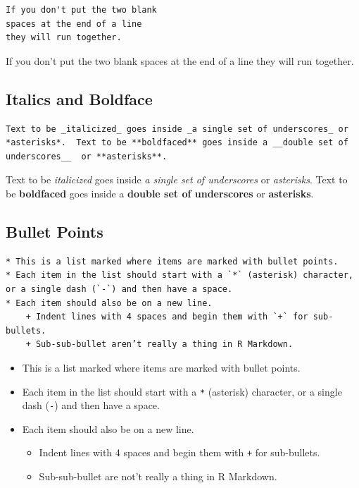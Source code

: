 \documentclass[]{book}
\providecommand{\tightlist}{%
  \setlength{\itemsep}{0pt}\setlength{\parskip}{0pt}}
\theoremstyle{definition}
\theoremstyle{definition}
\theoremstyle{definition}
\theoremstyle{remark}
\begin{document}
\begin{verbatim}
If you don't put the two blank
spaces at the end of a line
they will run together.
\end{verbatim}

If you don't put the two blank spaces at the end of a line they will run
together.

\hypertarget{italics-and-boldface}{%
\subsection{Italics and Boldface}\label{italics-and-boldface}}

\begin{verbatim}
Text to be _italicized_ goes inside _a single set of underscores_ or *asterisks*.  Text to be **boldfaced** goes inside a __double set of underscores__  or **asterisks**.
\end{verbatim}

Text to be \emph{italicized} goes inside \emph{a single set of
underscores} or \emph{asterisks}. Text to be \textbf{boldfaced} goes
inside a \textbf{double set of underscores} or \textbf{asterisks}.

\hypertarget{bullet-points}{%
\subsection{Bullet Points}\label{bullet-points}}

\begin{verbatim}
* This is a list marked where items are marked with bullet points.
* Each item in the list should start with a `*` (asterisk) character, or a single dash (`-`) and then have a space.
* Each item should also be on a new line.
    + Indent lines with 4 spaces and begin them with `+` for sub-bullets.
    + Sub-sub-bullet aren’t really a thing in R Markdown.
\end{verbatim}

\begin{itemize}
\tightlist
\item
  This is a list marked where items are marked with bullet points.
\item
  Each item in the list should start with a \texttt{*} (asterisk)
  character, or a single dash (\texttt{-}) and then have a space.
\item
  Each item should also be on a new line.

  \begin{itemize}
  \tightlist
  \item
    Indent lines with 4 spaces and begin them with \texttt{+} for
    sub-bullets.
  \item
    Sub-sub-bullet are not't really a thing in R Markdown.
  \end{itemize}
\end{itemize}
\end{document}
